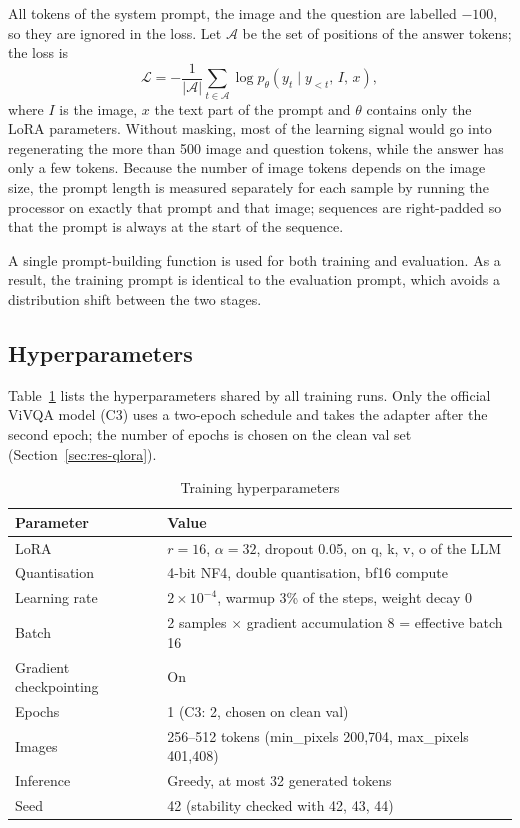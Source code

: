 All tokens of the system prompt, the image and the question are labelled $-100$, so they
are ignored in the loss. Let $\mathcal{A}$ be the set of positions of the answer tokens;
the loss is
\begin{equation}
\mathcal{L} = -\frac{1}{|\mathcal{A}|}\sum_{t \in \mathcal{A}} \log p_\theta\left(y_t \mid y_{<t},\, I,\, x\right),
\label{eq:loss}
\end{equation}
where $I$ is the image, $x$ the text part of the prompt and $\theta$ contains only the
LoRA parameters. Without masking, most of the learning signal would go into regenerating
the more than 500 image and question tokens, while the answer has only a few tokens.
Because the number of image tokens depends on the image size, the prompt length is
measured separately for each sample by running the processor on exactly that prompt and
that image; sequences are right-padded so that the prompt is always at the start of the
sequence.

A single prompt-building function is used for both training and evaluation. As a result,
the training prompt is identical to the evaluation prompt, which avoids a distribution
shift between the two stages.

\subsection{Hyperparameters}

Table~\ref{tab:met-hparams} lists the hyperparameters shared by all training runs. Only
the official ViVQA model (C3) uses a two-epoch schedule and takes the adapter after the
second epoch; the number of epochs is chosen on the clean val set
(Section~\ref{sec:res-qlora}).

\begin{table}[htbp]
\caption{Training hyperparameters}
\label{tab:met-hparams}
\centering
\small
\begin{tabular}{p{}p{}}
\toprule
\textbf{Parameter} & \textbf{Value} \\
\midrule
LoRA & $r = 16$, $\alpha = 32$, dropout 0.05, on q, k, v, o of the LLM \\
Quantisation & 4-bit NF4, double quantisation, bf16 compute \\
Learning rate & $2\times10^{-4}$, warmup 3\% of the steps, weight decay 0 \\
Batch & 2 samples $\times$ gradient accumulation 8 = effective batch 16 \\
Gradient checkpointing & On \\
Epochs & 1 (C3: 2, chosen on clean val) \\
Images & 256--512 tokens (min\_pixels 200,704, max\_pixels 401,408) \\
Inference & Greedy, at most 32 generated tokens \\
Seed & 42 (stability checked with 42, 43, 44) \\
\bottomrule
\end{tabular}
\end{table}

